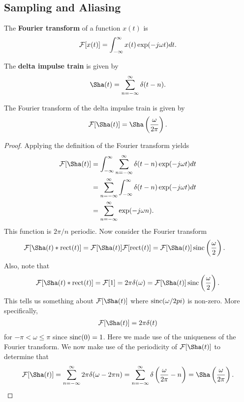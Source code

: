 \documentclass{memoir}
\begin{document}
\subsection{Sampling and Aliasing}
\begin{definition}
    The \textbf{Fourier transform} of a function $x(t)$ is
    \begin{align*}
        \mathcal{F}[x(t)] = \int_{-\infty}^{\infty} x(t) \exp(-j \omega t)dt.
    \end{align*}
\end{definition}
\begin{definition}
    The \textbf{delta impulse train} is given by
    \begin{align*}
        \Sha(t)=\sum_{n=-\infty}^{\infty} \delta(t- n).
    \end{align*}
\end{definition}
\begin{theorem}
    The Fourier transform of the delta impulse train is given by
    \begin{align*}
        \F[\Sha(t)]=\Sha\left(\frac{\omega}{2 \pi}\right).
    \end{align*}
\end{theorem}
\begin{proof}
    Applying the definition of the Fourier transform yields
    \begin{align*}
        \F[\Sha(t)] &= \int_{-\infty}^{\infty} \sum_{n=-\infty}^{\infty} \delta(t- n) \exp(-j \omega t)dt \\
        &= \sum_{n=-\infty}^{\infty}\int_{-\infty}^{\infty}\delta(t- n) \exp(-j \omega t)dt \\
        &= \sum_{n=-\infty}^{\infty} \exp(-j \omega n).
    \end{align*}
    This function is $2 \pi /n$ periodic. Now consider the Fourier transform
    \begin{align*}
        \F[\Sha(t) \ast \rect(t)] &= \F[\Sha(t)] \F[\rect(t)] = \F[\Sha(t)] \sinc\left(\frac{\omega}{2}\right).
    \end{align*}
    Also, note that
    \begin{align*}
        \F[\Sha(t) \ast \rect(t)] =\F[1] = 2 \pi \delta(\omega)= \F[\Sha(t)] \sinc\left(\frac{\omega}{2}\right).
    \end{align*}
    This tells us something about $\F[\Sha(t)]$ where $\operatorname{sinc}(\omega/2 pi)$ is non-zero. More specifically,
    \begin{align*}
        \F[\Sha(t)] = 2 \pi \delta(t)
    \end{align*}
    for $-\pi < \omega \le \pi$ since $\operatorname{sinc}(0)=1$. Here we made use of the uniqueness of the Fourier transform. We now make use of the periodicity of $\F[\Sha(t)]$ to determine that
    \begin{align*}
        \F[\Sha(t)] = \sum_{n=-\infty}^{\infty} 2 \pi \delta(\omega - 2 \pi n)= \sum_{n=-\infty}^{\infty} \delta\left(\frac{\omega}{2\pi} - n\right) = \Sha\left(\frac{\omega}{2\pi}\right).
    \end{align*}
\end{proof}
\end{document}
